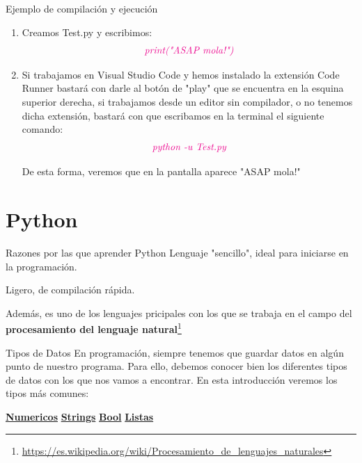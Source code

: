 \documentclass{beamer}
\begin{document}
	\begin{frame}{Ejemplo de compilación y ejecución}
	\begin{enumerate}
		\item Creamos Test.py y escribimos: 
		\begin{gather}
		\color{magenta}\textit{print("ASAP mola!")}
		\end{gather}
		\item Si trabajamos en Visual Studio Code y hemos instalado la extensión Code Runner bastará con darle al botón de "play" que se encuentra en la esquina superior derecha, si trabajamos desde un editor sin compilador, o no tenemos dicha extensión, bastará con que escribamos en la terminal el siguiente comando:
		\begin{gather}
			\color{magenta}\textit{python -u Test.py}
		\end{gather}
	
		De esta forma, veremos que en la pantalla aparece "ASAP mola!"
	\end{enumerate}
	\end{frame}
\section{Python}
    \begin{frame}{Razones por las que aprender Python}
    	\setlength{\parskip}{8mm} %
        Lenguaje "sencillo", ideal para iniciarse en la programación.
        
        Ligero, de compilación rápida.
        
        Además, es uno de los lenguajes pricipales con los que se trabaja en el campo del \textbf{procesamiento del lenguaje natural}\footnote{\url{https://es.wikipedia.org/wiki/Procesamiento_de_lenguajes_naturales}}
    \end{frame}
    \begin{frame}{Tipos de Datos}
    	En programación, siempre tenemos que guardar datos en algún punto de nuestro programa. Para ello, debemos conocer bien los diferentes tipos de datos con los que nos vamos a encontrar. En esta introducción veremos los tipos más comunes:
		\vspace{1cm}
		
	 \centering\hyperlink{datos:numericos}{\textbf{Numericos}}
		\hspace{1cm} \hyperlink{datos:strings}{\textbf{Strings}}
		\hspace{1cm} \hyperlink{datos:bool}{\textbf{Bool}}
		\hspace{1cm} \hyperlink{datos:listas}{\textbf{Listas}}
    \end{frame}
    
\end{document}
